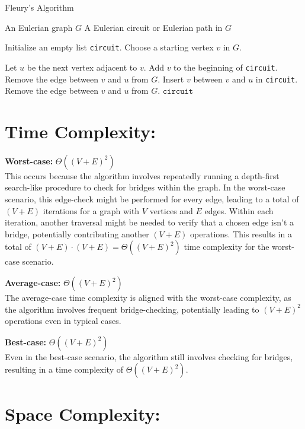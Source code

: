 \documentclass[14pt, times, a4paper]{extarticle}
\begin{document}
\begin{algorithm}[H]
\caption{Fleury's Algorithm}
\label{alg:fleury}
\begin{algorithmic}[1]
\REQUIRE An Eulerian graph $G$
\ENSURE A Eulerian circuit or Eulerian path in $G$

\STATE Initialize an empty list \texttt{circuit}.
\STATE Choose a starting vertex $v$ in $G$.

\STATE Let $u$ be the next vertex adjacent to $v$.
    \STATE Add $v$ to the beginning of \texttt{circuit}.
    \STATE Remove the edge between $v$ and $u$ from $G$.
  \ELSE
    \STATE Insert $v$ between $v$ and $u$ in \texttt{circuit}.
    \STATE Remove the edge between $v$ and $u$ from $G$.
  \ENDIF
\ENDWHILE
\RETURN $\texttt{circuit}$
\end{algorithmic}
\end{algorithm}
\section*{Time Complexity:}

\textbf{Worst-case:} \( \Theta((V+E)^2) \)\\
This occurs because the algorithm involves repeatedly running a depth-first search-like procedure to check for bridges within the graph. In the worst-case scenario, this edge-check might be performed for every edge, leading to a total of \( (V+E) \) iterations for a graph with \( V \) vertices and \( E \) edges. Within each iteration, another traversal might be needed to verify that a chosen edge isn't a bridge, potentially contributing another \( (V+E) \) operations. This results in a total of \( (V+E) \cdot (V+E) = \Theta((V+E)^2) \) time complexity for the worst-case scenario.\cite{geeksforgeeks}

\textbf{Average-case:} \( \Theta((V+E)^2) \)\\
The average-case time complexity is aligned with the worst-case complexity, as the algorithm involves frequent bridge-checking, potentially leading to \( (V+E)^2 \) operations even in typical cases.

\textbf{Best-case:} \( \Theta((V+E)^2) \)\\
Even in the best-case scenario, the algorithm still involves checking for bridges, resulting in a time complexity of \( \Theta((V+E)^2) \).

\section*{Space Complexity:}
\end{document}
